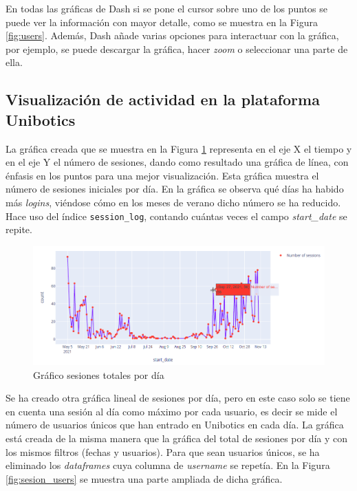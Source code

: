 En todas las gráficas de Dash si se pone el cursor sobre uno de los puntos se puede ver la información con mayor detalle, como se muestra en la Figura \ref{fig:users}. Además, Dash añade varias opciones para interactuar con la gráfica, por ejemplo, se puede descargar la gráfica, hacer \textit{zoom} o seleccionar una parte de ella. \\
\subsection{Visualización de actividad en la plataforma Unibotics}

La gráfica creada que se muestra en la Figura \ref{fig:sesion} representa en el eje X el tiempo y en el eje Y el número de sesiones, dando como resultado una gráfica de línea, con énfasis en los puntos para una mejor visualización. Esta gráfica muestra el número de sesiones iniciales por día. En la gráfica se observa qué días ha habido más \textit{logins}, viéndose cómo en los meses de verano dicho número se ha reducido. Hace uso del índice \texttt{session\_log}, contando cuántas veces el campo \textit{start\_date} se repite.\\



\begin{figure}[H]
    \centering
    \includegraphics[width=16cm, keepaspectratio]{img/sesion.png}
    \caption{Gráfico sesiones totales por día}
    \label{fig:sesion}
\end{figure}
Se ha creado otra gráfica lineal de sesiones por día, pero en este caso solo se tiene en cuenta una sesión al día como máximo por cada usuario, es decir se mide el número de usuarios únicos que han entrado en Unibotics en cada día. La gráfica está creada de la misma manera que la gráfica del total de sesiones por día y con los mismos filtros (fechas y usuarios). Para que sean usuarios únicos, se ha eliminado los\textit{ dataframes} cuya columna de \textit{username} se repetía. En la Figura \ref{fig:sesion_users}  se muestra una parte ampliada de dicha gráfica.\\

